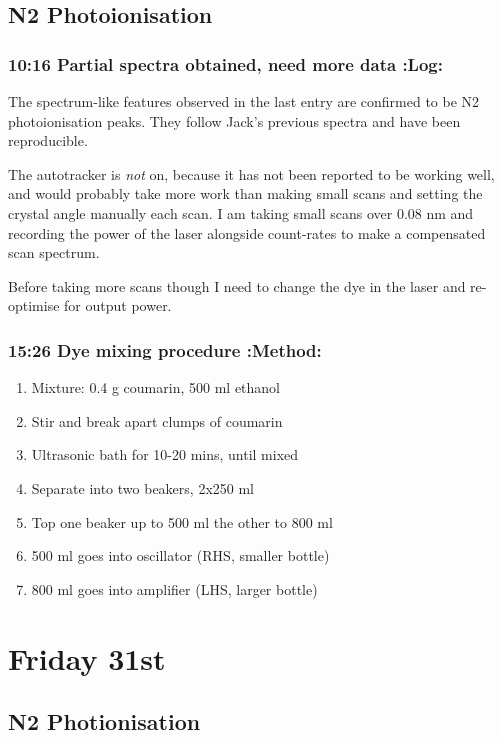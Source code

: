 \documentclass[11pt]{article}
\begin{document}
\subsection*{N2 Photoionisation}
\label{sec-14-1}
\subsubsection*{10:16 Partial spectra obtained, need more data \textbf{:Log:}}
\label{sec-14-1-1}

The spectrum-like features observed in the last entry are confirmed to
be N2 photoionisation peaks. They follow Jack's previous spectra and
have been reproducible.

The autotracker is \emph{not} on, because it has not been reported to be
working well, and would probably take more work than making small
scans and setting the crystal angle manually each scan. I am taking
small scans over 0.08 nm and recording the power of the laser
alongside count-rates to make a compensated scan spectrum.

Before taking more scans though I need to change the dye in the laser
and re-optimise for output power.
\subsubsection*{15:26 Dye mixing procedure \textbf{:Method:}}
\label{sec-14-1-2}

\begin{enumerate}
\item Mixture: 0.4 g coumarin, 500 ml ethanol
\item Stir and break apart clumps of coumarin
\item Ultrasonic bath for 10-20 mins, until mixed
\item Separate into two beakers, 2x250 ml
\item Top one beaker up to 500 ml the other to 800 ml
\item 500 ml goes into oscillator (RHS, smaller bottle)
\item 800 ml goes into amplifier (LHS, larger bottle)
\end{enumerate}
\section*{Friday 31st}
\label{sec-15}
\subsection*{N2 Photionisation}
\label{sec-15-1}
\end{document}
